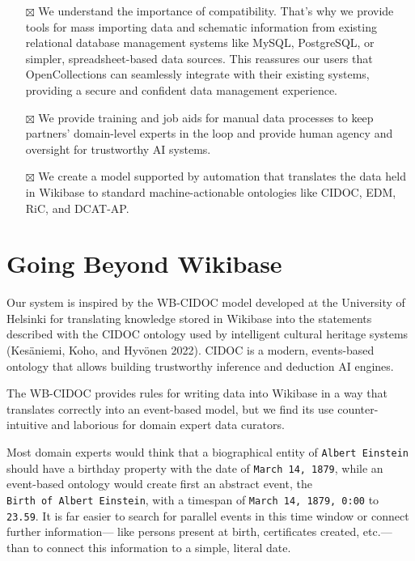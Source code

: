\documentclass[
  letterpaper,
  DIV=11,
  numbers=noendperiod]{scrreprt}
\begin{document}
\begin{itemize}
\item[$\boxtimes$]
  We understand the importance of compatibility. That's why we provide
  tools for mass importing data and schematic information from existing
  relational database management systems like MySQL, PostgreSQL, or
  simpler, spreadsheet-based data sources. This reassures our users that
  OpenCollections can seamlessly integrate with their existing systems,
  providing a secure and confident data management experience.
\item[$\boxtimes$]
  We provide training and job aids for manual data processes to keep
  partners' domain-level experts in the loop and provide human agency
  and oversight for trustworthy AI systems.
\item[$\boxtimes$]
  We create a model supported by automation that translates the data
  held in Wikibase to standard machine-actionable ontologies like CIDOC,
  EDM, RiC, and DCAT-AP.
\end{itemize}

\section{Going Beyond Wikibase}\label{going-beyond-wikibase}

Our system is inspired by the WB-CIDOC model developed at the University
of Helsinki for translating knowledge stored in Wikibase into the
statements described with the CIDOC ontology used by intelligent
cultural heritage systems (Kesäniemi, Koho, and Hyvönen 2022). CIDOC is
a modern, events-based ontology that allows building trustworthy
inference and deduction AI engines.

The WB-CIDOC provides rules for writing data into Wikibase in a way that
translates correctly into an event-based model, but we find its use
counter-intuitive and laborious for domain expert data curators.

Most domain experts would think that a biographical entity of
\texttt{Albert\ Einstein} should have a birthday property with the date
of \texttt{March\ 14,\ 1879}, while an event-based ontology would create
first an abstract event, the \texttt{Birth\ of\ Albert\ Einstein}, with
a timespan of \texttt{March\ 14,\ 1879,\ 0:00} to \texttt{23.59}. It is
far easier to search for parallel events in this time window or connect
further information--- like persons present at birth, certificates
created, etc.---than to connect this information to a simple, literal
date.
\end{document}
